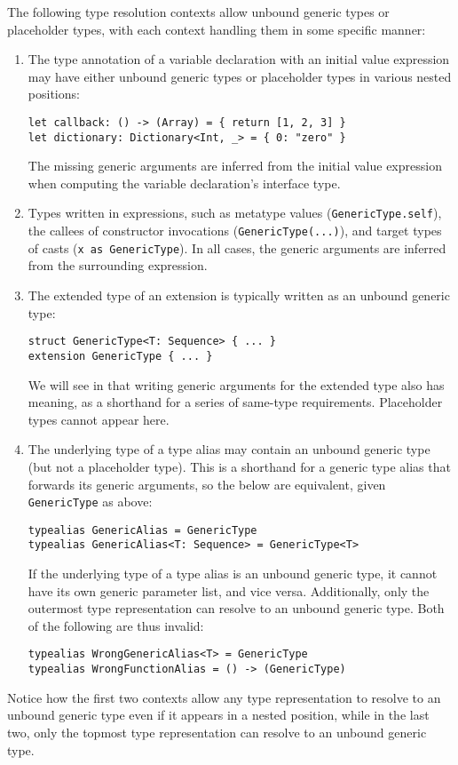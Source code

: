 \documentclass[../generics]{subfiles}
\begin{document}
The following type resolution contexts allow unbound generic types or placeholder types, with each context handling them in some specific manner:
\begin{enumerate}

\item The type annotation of a variable declaration with an initial value expression may have either unbound generic types or placeholder types in various nested positions:
\begin{Verbatim}
let callback: () -> (Array) = { return [1, 2, 3] }
let dictionary: Dictionary<Int, _> = { 0: "zero" }
\end{Verbatim}
The missing generic arguments are inferred from the initial value expression when computing the variable declaration's interface type.

\item Types written in expressions, such as metatype values (\texttt{GenericType.self}), the callees of constructor invocations (\texttt{GenericType(...)}), and target types of casts (\texttt{x as GenericType}). In all cases, the generic arguments are inferred from the surrounding expression.

\item The extended type of an extension is typically written as an unbound generic type:
\begin{Verbatim}
struct GenericType<T: Sequence> { ... }
extension GenericType { ... }
\end{Verbatim}
We will see in  that writing generic arguments for the extended type also has meaning, as a shorthand for a series of same-type requirements. Placeholder types cannot appear here.

\item The underlying type of a type alias may contain an unbound generic type (but not a placeholder type). This is a shorthand for a generic type alias that forwards its generic arguments, so the below are equivalent, given \texttt{GenericType} as above:
\begin{Verbatim}
typealias GenericAlias = GenericType
typealias GenericAlias<T: Sequence> = GenericType<T>
\end{Verbatim}
If the underlying type of a type alias is an unbound generic type, it cannot have its own generic parameter list, and vice versa. Additionally, only the outermost type representation can resolve to an unbound generic type. Both of the following are thus invalid:
\begin{Verbatim}
typealias WrongGenericAlias<T> = GenericType
typealias WrongFunctionAlias = () -> (GenericType)
\end{Verbatim}
\end{enumerate}
Notice how the first two contexts allow any type representation to resolve to an unbound generic type even if it appears in a nested position, while in the last two, only the topmost type representation can resolve to an unbound generic type.
\end{document}
